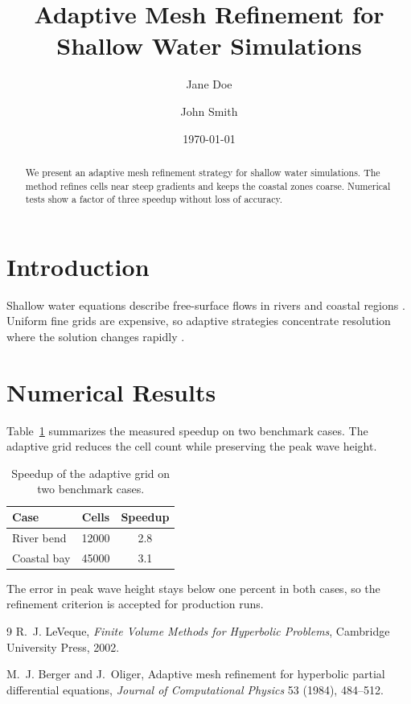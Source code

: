 \documentclass{article}
\title{Adaptive Mesh Refinement for Shallow Water Simulations}
\author{Jane Doe \and John Smith}
\date{\today}
\begin{document}
\maketitle

\begin{abstract}
We present an adaptive mesh refinement strategy for shallow water
simulations. The method refines cells near steep gradients and keeps the
coastal zones coarse. Numerical tests show a factor of three speedup
without loss of accuracy.
\end{abstract}

\section{Introduction}
Shallow water equations describe free-surface flows in rivers and coastal
regions \cite{leveque2002}. Uniform fine grids are expensive, so adaptive
strategies concentrate resolution where the solution changes rapidly
\cite{berger1984}.

\section{Numerical Results}
Table~\ref{tab:speedup} summarizes the measured speedup on two benchmark
cases. The adaptive grid reduces the cell count while preserving the
peak wave height.

\begin{table}[htbp]
  \centering
  \caption{Speedup of the adaptive grid on two benchmark cases.}
  \label{tab:speedup}
  \begin{tabular}{lcc}
    \toprule
    Case & Cells & Speedup \\
    \midrule
    River bend & 12000 & 2.8 \\
    Coastal bay & 45000 & 3.1 \\
    \bottomrule
  \end{tabular}
\end{table}

The error in peak wave height stays below one percent in both cases, so
the refinement criterion is accepted for production runs.

\begin{thebibliography}{9}
R.~J. LeVeque, \emph{Finite Volume Methods for Hyperbolic Problems},
Cambridge University Press, 2002.

M.~J. Berger and J.~Oliger, Adaptive mesh refinement for hyperbolic
partial differential equations, \emph{Journal of Computational Physics}
53 (1984), 484--512.
\end{thebibliography}
\end{document}
